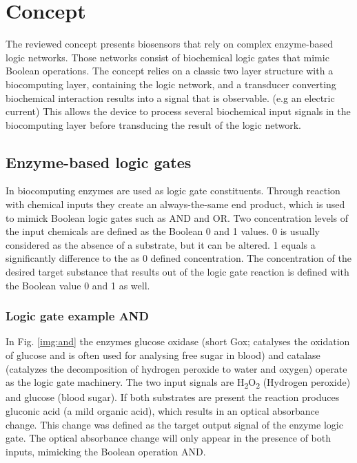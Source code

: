 \documentclass[runningheads]{llncs}
\begin{document}
	
	
\section{Concept}

The reviewed concept presents biosensors that rely on complex enzyme-based logic networks. Those networks consist of biochemical logic gates that mimic Boolean operations. The concept relies on a classic two layer structure with a biocomputing layer, containing the logic network, and a transducer converting biochemical interaction results into a signal that is observable. (e.g an electric current) This allows the device to process several biochemical input signals in the biocomputing layer before transducing the result of the logic network. \cite{application review}\cite{original}\cite{state of the art}


\subsection{Enzyme-based logic gates}		
		In biocomputing enzymes are used as logic gate constituents. Through reaction with chemical inputs they create an always-the-same end product, which is used to mimick Boolean logic gates such as AND and OR. Two concentration levels of the input chemicals are defined as the Boolean 0 and 1 values. 0 is usually considered as the absence of a substrate, but it can be altered. 1 equals a significantly difference to the as 0 defined concentration. 
		The concentration of the desired target substance that results out of the logic gate reaction is defined with the Boolean value 0 and 1 as well. \cite{original} \cite{haupt}\\
	
		\subsubsection{Logic gate example AND}
		In Fig. \ref{img:and} the enzymes glucose oxidase (short Gox; catalyses the oxidation of glucose and is often used for analysing free sugar in blood) and catalase (catalyzes the decomposition of hydrogen peroxide to water and oxygen) operate as the logic gate machinery. The two input signals are H\textsubscript{2}O\textsubscript{2} (Hydrogen peroxide) and glucose (blood sugar). If both substrates are present the reaction produces gluconic acid (a mild organic acid), which results in an optical absorbance change. This change was defined as the target output signal of the enzyme logic gate. The optical absorbance change will only appear in the presence of both inputs, mimicking the Boolean operation AND. \cite{original}\cite{haupt}\cite{chemie}
		
\end{document}
